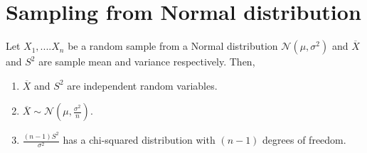 \documentclass[a4paper,english,12pt]{article}
\begin{document}
\section{Sampling from Normal distribution}
\begin{thm}
Let $X_1,....X_n$ be a random sample from a Normal distribution $\mathcal{N}(\mu,\sigma^2)$ and $\overline{X}$ and $S^2$ are sample mean and variance respectively. Then,
\renewcommand{\labelenumi}{\alph{enumi})}
\begin{enumerate}
\item $\overline{X}$ and $S^2$ are independent random variables. 
\item $\overline{X} \sim \mathcal{N}(\mu,\frac{\sigma^2}{n})$.
\item $\frac{(n-1)S^2}{\sigma^{2}}$ has a chi-squared distribution with $(n-1)$ degrees of freedom. 
\end{enumerate}
\end{thm}
\end{document}
